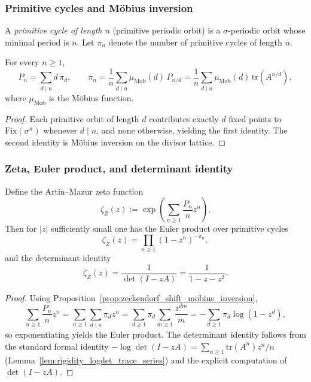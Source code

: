 \subsubsection{Primitive cycles and M\"obius inversion}
\label{subsec:zeckendorf_shift_primitive_mobius}

\begin{definition}\label{def:zeckendorf_shift_primitive_cycles}
A \emph{primitive cycle of length $n$} (primitive periodic orbit) is a $\sigma$-periodic orbit whose minimal period is $n$.
Let $\pi_n$ denote the number of primitive cycles of length $n$.
\end{definition}

\begin{proposition}\label{prop:zeckendorf_shift_mobius_inversion}
\MathTag For every $n\ge 1$,
\[
P_n=\sum_{d\mid n} d\,\pi_d,
\qquad
\pi_n=\frac{1}{n}\sum_{d\mid n}\mu_{\mathrm{Mob}}(d)\,P_{n/d}
=\frac{1}{n}\sum_{d\mid n}\mu_{\mathrm{Mob}}(d)\,\mathrm{tr}(A^{n/d}),
\]
where $\mu_{\mathrm{Mob}}$ is the M\"obius function.
\end{proposition}

\begin{proof}
Each primitive orbit of length $d$ contributes exactly $d$ fixed points to $\mathrm{Fix}(\sigma^n)$ whenever $d\mid n$, and none otherwise, yielding the first identity.
The second identity is M\"obius inversion on the divisor lattice.
\end{proof}

\subsubsection{Zeta, Euler product, and determinant identity}
\label{subsec:zeckendorf_shift_zeta_det}

\begin{proposition}\label{prop:zeckendorf_shift_zeta_det}
\MathTag Define the Artin--Mazur zeta function
\[
\zeta_Z(z):=\exp\!\left(\sum_{n\ge 1}\frac{P_n}{n}z^n\right).
\]
Then for $|z|$ sufficiently small one has the Euler product over primitive cycles
\[
\zeta_Z(z)=\prod_{n\ge 1}(1-z^n)^{-\pi_n},
\]
and the determinant identity
\[
\zeta_Z(z)=\frac{1}{\det(I-zA)}=\frac{1}{1-z-z^2}.
\]
\end{proposition}

\begin{proof}
Using Proposition~\ref{prop:zeckendorf_shift_mobius_inversion},
\[
\sum_{n\ge 1}\frac{P_n}{n}z^n
=\sum_{n\ge 1}\sum_{d\mid n}\pi_d z^n
=\sum_{d\ge 1}\pi_d\sum_{m\ge 1}\frac{z^{dm}}{m}
=-\sum_{d\ge 1}\pi_d\log(1-z^d),
\]
so exponentiating yields the Euler product.
The determinant identity follows from the standard formal identity $-\log\det(I-zA)=\sum_{n\ge 1}\mathrm{tr}(A^n)z^n/n$ (Lemma~\ref{lem:rigidity_logdet_trace_series}) and the explicit computation of $\det(I-zA)$.
\end{proof}

